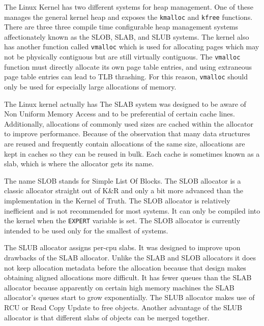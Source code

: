 \documentclass[10pt,conference,draftclsnofoot,onecolumn]{IEEEtran}
\begin{document}
The Linux Kernel has two different systems for heap management. One of these manages the general kernel heap and exposes the \texttt{kmalloc} and \texttt{kfree} functions. There are three three compile time configurable heap management systems affectionately known as the SLOB, SLAB, and SLUB systems. The kernel also has another function called \texttt{vmalloc} which is used for allocating pages which may not be physically contiguous but are still virtually contiguous. The \texttt{vmalloc} function must directly allocate its own page table entries, and using extraneous page table entries can lead to TLB thrashing. For this reason, \texttt{vmalloc} should only be used for especially large allocations of memory\cite{1_love_2010}.

The Linux kernel actually has The SLAB system was designed to be aware of Non Uniform Memory Access and to be preferential of certain cache lines. Additionally, allocations of commonly used sizes are cached within the allocator to improve performance. Because of the observation that many data structures are reused and frequently contain allocations of the same size, allocations are kept in caches so they can be reused in bulk. Each cache is sometimes known as a slab, which is where the allocator gets its name\cite{1_love_2010}.

The name SLOB stands for Simple List Of Blocks. The SLOB allocator is a classic allocator straight out of K\&R and only a bit more advanced than the implementation in the Kernel of Truth. The SLOB allocator is relatively inefficient and is not recommended for most systems. It can only be compiled into the kernel when the \texttt{EXPERT} variable is set. The SLOB allocator is currently intended to be used only for the smallest of systems.


The SLUB allocator assigns per-cpu slabs. It was designed to improve upon drawbacks of the SLAB allocator. Unlike the SLAB and SLOB allocators it does not keep allocation metadata before the allocation because that design makes obtaining aligned allocations more difficult. It has fewer queues than the SLAB allocator because apparently on certain high memory machines the SLAB allocator's queues start to grow exponentially. The SLUB allocator makes use of RCU or Read Copy Update to free objects. Another advantage of the SLUB allocator is that different slabs of objects can be merged together\cite{slub}.
\end{document}
